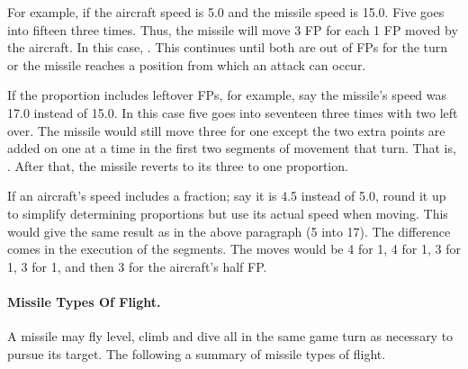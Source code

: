 For example, if the aircraft speed is 5.0 and the missile speed is 15.0. Five goes into fifteen three times. Thus, the missile will move 3 FP for each 1 FP moved by the aircraft.  In this case, .  This continues until both are out of FPs for the turn or the missile reaches a position from which an attack can occur.

If the proportion includes leftover FPs, for example, say the missile's speed was 17.0 instead of 15.0. In this case five goes into seventeen three times with two left over. The missile would still move three for one except the two extra points are added on one at a time in the first two segments of movement that turn. That is, . After that, the missile reverts to its three to one proportion.

If an aircraft's speed includes a fraction; say it is 4.5 instead of 5.0, round it up to simplify determining proportions but use its actual speed when moving. This would give the same result as in the above paragraph (5 into 17). The difference comes in the execution of the segments. The moves would be 4 for 1, 4 for 1, 3 for 1, 3 for 1, and then 3 for the aircraft's half FP.


\paragraph{Missile Types Of Flight.} A missile may fly level, climb and dive all in the same game turn as necessary to pursue its target. The following  a summary of missile types of flight.

